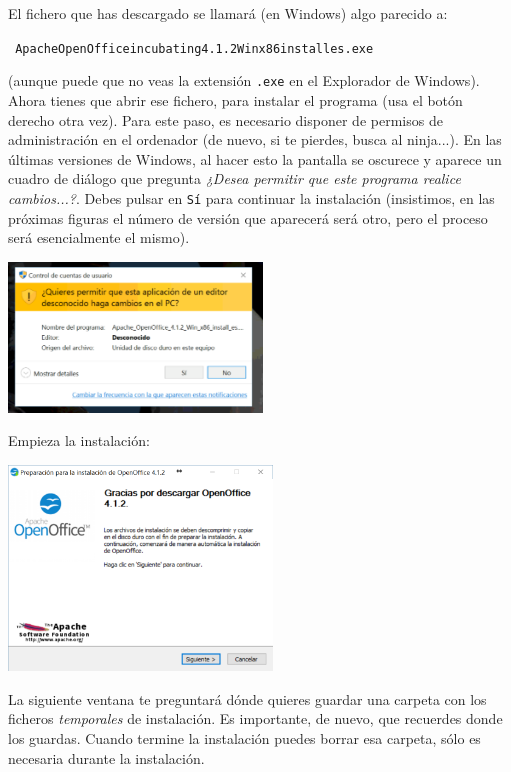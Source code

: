 \documentclass[10pt,a4paper]{article}
\newcounter {cont01}
\begin{document}
El fichero que has descargado se llamará (en Windows) algo parecido a:
\begin{center}
{\tt
Apache{\textunderscore}OpenOffice{\textunderscore}incubating{\textunderscore}4.1.2{\textunderscore}Winx{\textunderscore}86{\textunderscore}install{\textunderscore}es.exe}
\end{center}
(aunque puede que no veas la extensión {\tt .exe} en el Explorador de Windows). Ahora tienes que
abrir ese fichero, para instalar el programa (usa el botón derecho otra vez).  Para este paso, es
necesario disponer de permisos de administración en el ordenador (de nuevo, si te pierdes, busca al ninja...). En las últimas versiones de Windows, al hacer esto la pantalla se oscurece y aparece un
cuadro de diálogo que pregunta {\em ¿Desea permitir que este programa realice cambios...?}. Debes
pulsar en {\tt Sí} para continuar la instalación (insistimos, en las próximas figuras el número de
versión que aparecerá será otro, pero el proceso será esencialmente el mismo).
    \begin{center}
    \includegraphics[height=4cm]{../fig/Tut00-OpenOffice-03-201605.png}
    \end{center}
Empieza la instalación:
    \begin{center}
    \includegraphics[width=7cm]{../fig/Tut00-OpenOffice-04-201605.png}
    \end{center}
La siguiente ventana te preguntará dónde quieres guardar una carpeta con los ficheros {\em
temporales} de instalación. Es importante, de nuevo, que recuerdes donde los guardas. Cuando
termine la instalación puedes borrar esa carpeta, sólo es necesaria durante la instalación.
\end{document}
